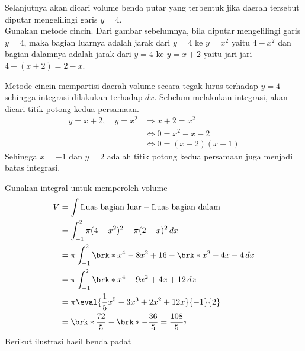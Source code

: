 \begin{enumerate}[leftmargin=*, label={\arabic*}.]
\begin{center}
\end{center}
Selanjutnya akan dicari volume benda putar yang terbentuk jika daerah tersebut diputar 
mengelilingi garis $y=4$.\\
Gunakan metode cincin. Dari gambar sebelumnya, bila diputar mengelilingi garis $y=4$, maka bagian 
luarnya adalah jarak dari $y=4$ ke $y=x^{2}$ yaitu $4-x^{2}$ dan bagian dalamnya adalah jarak 
dari $y=4$ ke $y=x+2$ yaitu jari-jari $4-(x+2)=2-x$. 

Metode cincin mempartisi daerah volume secara tegak lurus terhadap $y=4$ 
sehingga integrasi dilakukan terhadap $dx$. Sebelum melakukan integrasi, akan dicari titik potong 
kedua persamaan.
\begin{align*}
    y = x+2,\quad y = x^{2} &\Longrightarrow x+2= x^{2}\\
    &\iff 0 = x^{2}-x-2\\
    &\iff 0 = (x-2)(x+1)
\end{align*}
Sehingga $x = -1$ dan $y=2$ adalah titik potong kedua persamaan juga menjadi batas integrasi.

Gunakan integral untuk memperoleh volume
\begin{align*}
    V &= \int \text{Luas bagian luar} - \text{Luas bagian dalam}\\
    &=\int_{-1}^{2} \pi(4-x^2)^2 - \pi(2-x)^{2}\,dx \\
    &=\pi\int_{-1}^{2} \brk*{x^{4}-8x^{2}+16} - \brk*{x^{2}-4x+4}\,dx \\
    &=\pi\int_{-1}^{2} \brk*{x^{4}-9x^{2}+4x+12}\,dx \\
    &=\pi\eval{\frac{1}{5}x^{5}-3x^{3}+2x^{2}+12x}{-1}{2} \\
    &= \brk*{\frac{72}{5}-\brk*{-\frac{36}{5}}}=\frac{108}{5}\pi
\end{align*}
Berikut ilustrasi hasil benda padat
\begin{center}
\end{center}
\end{enumerate}
